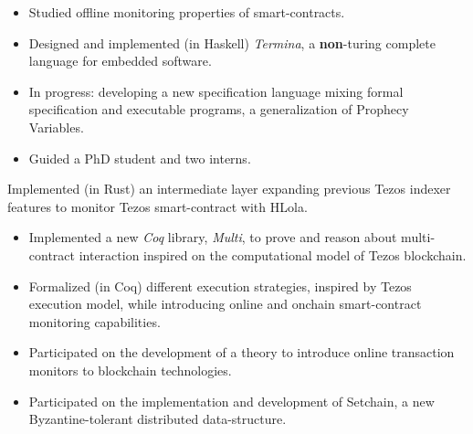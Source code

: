 
    \begin{itemize}
        \item Studied offline monitoring properties of smart-contracts.
        \item Designed and implemented (in Haskell) \emph{Termina}, a
            \textbf{non}-turing complete language for embedded software.
        \item In progress: developing a new specification language mixing formal
            specification and executable programs, a generalization of Prophecy Variables.
        \item Guided a PhD student and two interns.
    \end{itemize}
    \divider

        Implemented (in Rust) an intermediate layer expanding previous
            Tezos indexer features to monitor Tezos smart-contract with HLola.

    \divider

    \begin{itemize}
        \item Implemented a new \emph{Coq} library,
            \emph{Multi}, to prove and reason about multi-contract
            interaction inspired on the computational model of Tezos blockchain.
        \item Formalized (in Coq) different execution strategies, inspired by
            Tezos execution model, while introducing online and onchain smart-contract
            monitoring capabilities.
        \item Participated on the development of a theory to introduce
            online transaction monitors to blockchain
            technologies.
        \item Participated on the implementation and development of
            Setchain, a new Byzantine-tolerant distributed
            data-structure.
    \end{itemize}
    \divider

